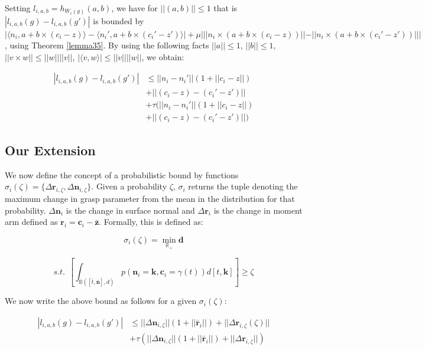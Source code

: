 \documentclass[letterpaper, 10 pt, conference]{ieeeconf}  %
\begin{document}
Setting $l_{i,a,b} = h_{W_i(g)}(a,b)$, we have for $||(a,b)|| \leq 1$ that is $|l_{i,a,b}(g) - l_{i,a,b}(g')|$ is bounded by $|\langle n_i,a+b\times (c_i-z)\rangle - \langle n_i',a+b\times(c_i'-z')\rangle|+\mu|||n_i \times (a+b \times (c_i -z))|| - ||n_i \times (a + b \times (c_i' - z')) |||$, using Theorem \ref{lemma35}.
By using the following facts $||a|| \leq 1$, $||b|| \leq 1$, $||v \times w || \leq ||w||||v||$, $|\langle v,w\rangle | \leq ||v||||w||$, we obtain:  

\begin{align*}
|l_{i,a,b}(g) - l_{i,a,b}(g')| &\leq ||n_i - n_i'||(1+||c_i - z||) \\
					&+ ||(c_i - z)-(c_i'-z')|| \\
					&+ \tau(||n_i - n_i'||(1+||c_i - z||)\\
					&+||(c_i - z)-(c_i'-z')||)
\end{align*}

\subsection{Our Extension}
We now define the concept of a probabilistic bound by functions $\sigma_i(\zeta) = \lbrace\Delta \textbf{r}_{i,\zeta}, \Delta \textbf{n}_{i,\zeta}\rbrace$. Given a probability $\zeta$, $\sigma_i$ returns the tuple denoting the maximum change in grasp parameter from the mean in the distribution for that probability. $\Delta \textbf{n}_i$ is the change in surface normal and $\Delta \textbf{r}_i$ is the change in moment arm defined as $\textbf{r}_i = \textbf{c}_i - \bar{\textbf{z}}$.
Formally, this is defined as:

\[
  \sigma_i(\zeta)
  =
  \min_{\mathbb{R}_+} \textbf{d}
\]

\[
  s.t. \ \ \left[ \int_{\mathbb{B}([\bar{t},\bar{\textbf{n}}], d)} p(\textbf{n}_i = \textbf{k},\textbf{c}_i=\gamma(t)) d[t,\textbf{k}] \right] \geq \zeta
\]



We now write the above bound as follows for a given $\sigma_i(\zeta)$: 

 \begin{align*}
|l_{i,a,b}(g) - l_{i,a,b}(g')| & \leq ||\Delta \textbf{n}_{i,\zeta}||(1+||\bar{\textbf{r}}_i||) + ||\Delta{\textbf{r}_{i,\zeta}}(\zeta)|| \\
                                      &+ \tau(||\Delta \textbf{n}_{i,\zeta}||(1+||\bar{\textbf{r}}_i||)+||\Delta \textbf{r}_{i,\zeta}||)
\end{align*}
\end{document}
